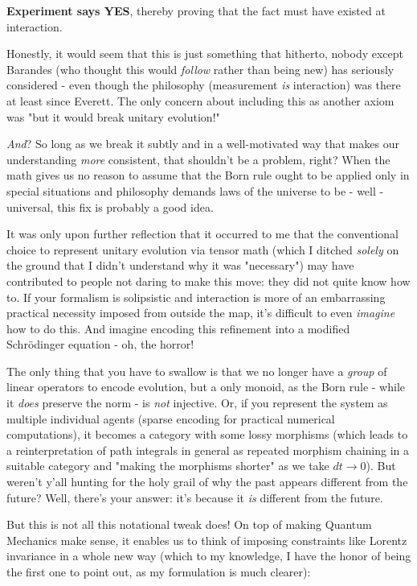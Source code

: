 \documentclass{article}
\begin{document}
\textbf{Experiment says YES}, thereby proving that the fact must have existed at interaction.

Honestly, it would seem that this is just something that hitherto, nobody except Barandes (who thought this would \textit{follow} rather than being new) has seriously considered - even though the philosophy (measurement \textit{is} interaction) was there at least since Everett. The only concern about including this as another axiom was "but it would break unitary evolution!"

\textit{And}? So long as we break it subtly and in a well-motivated way that makes our understanding \textit{more} consistent, that shouldn't be a problem, right? When the math gives us no reason to assume that the Born rule ought to be applied only in special situations and philosophy demands laws of the universe to be - well - universal, this fix is probably a good idea.

It was only upon further reflection that it occurred to me that the conventional choice to represent unitary evolution via tensor math (which I ditched \textit{solely} on the ground that I didn't understand why it was "necessary") may have contributed to people not daring to make this move: they did not quite know how to. If your formalism is solipsistic and interaction is more of an embarrassing practical necessity imposed from outside the map, it's difficult to even \textit{imagine} how to do this. And imagine encoding this refinement into a modified Schrödinger equation - oh, the horror!

The only thing that you have to swallow is that we no longer have a \textit{group} of linear operators to encode evolution, but a only monoid, as the Born rule - while it \textit{does} preserve the norm - is \textit{not} injective. Or, if you represent the system as multiple individual agents (sparse encoding for practical numerical computations), it becomes a category with some lossy morphisms (which leads to a reinterpretation of path integrals in general as repeated morphism chaining in a suitable category and "making the morphisms shorter" as we take $dt\to 0$). But weren't y'all hunting for the holy grail of why the past appears different from the future? Well, there's your answer: it's because it \textit{is} different from the future.

But this is not all this notational tweak does! On top of making Quantum Mechanics make sense, it enables us to think of imposing constraints like Lorentz invariance in a whole new way (which to my knowledge, I have the honor of being the first one to point out, as my formulation is much clearer):
\end{document}
